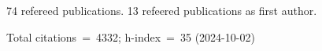 74 refereed publications. 13 refeered publications as first author.

Total citations~=~4332; h-index~=~35 (2024-10-02)